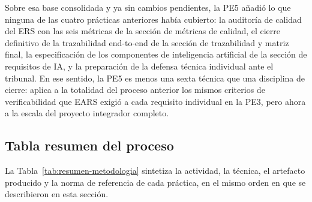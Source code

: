 \documentclass[journal,onecolumn]{IEEEtran}
\begin{document}
Sobre esa base consolidada y ya sin
cambios pendientes, la PE5 añadió lo que ninguna de las cuatro prácticas anteriores había
cubierto: la auditoría de calidad del ERS con las seis métricas de
la sección de métricas de calidad, el cierre definitivo de la trazabilidad end-to-end de la
sección de trazabilidad y matriz final, la especificación de los componentes de
inteligencia artificial de la sección de requisitos de IA, y la preparación de la defensa técnica individual
ante el tribunal. En ese sentido, la PE5 es menos una sexta técnica que una disciplina de
cierre: aplica a la totalidad del proceso anterior los mismos criterios de verificabilidad
que EARS exigió a cada requisito individual en la PE3, pero ahora a la escala del proyecto
integrador completo.

\newpage

\subsection{Tabla resumen del proceso}

La Tabla~\ref{tab:resumen-metodologia} sintetiza la actividad, la técnica, el artefacto
producido y la norma de referencia de cada práctica, en el mismo orden en que se
describieron en esta sección.
\end{document}
